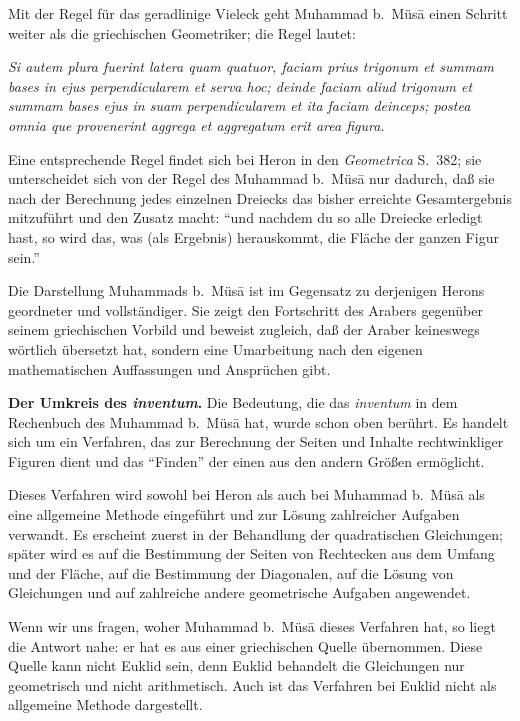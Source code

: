 \documentclass[11pt,a4paper]{article}
\newcommand{\enquote}[1]{``#1''}
\begin{document}
Mit der Regel f\"ur das geradlinige Vieleck geht Muhammad b.\ M\"us\=a einen Schritt weiter als die griechischen Geometriker; die Regel lautet:

\textit{Si autem plura fuerint latera quam quatuor, faciam prius trigonum et summam bases in ejus perpendicularem et serva hoc; deinde faciam aliud trigonum et summam bases ejus in suam perpendicularem et ita faciam deinceps; postea omnia que provenerint aggrega et aggregatum erit area figura.}

Eine entsprechende Regel findet sich bei Heron in den \textit{Geometrica} S.\ 382; sie unterscheidet sich von der Regel des Muhammad b.\ M\"us\=a nur dadurch, da\ss{} sie nach der Berechnung jedes einzelnen Dreiecks das bisher erreichte Gesamtergebnis mitzuf\"uhrt und den Zusatz macht: \enquote{und nachdem du so alle Dreiecke erledigt hast, so wird das, was (als Ergebnis) herauskommt, die Fl\"ache der ganzen Figur sein.}

Die Darstellung Muhammads b.\ M\"us\=a ist im Gegensatz zu derjenigen Herons geordneter und vollst\"andiger. Sie zeigt den Fortschritt des Arabers gegen\"uber seinem griechischen Vorbild und beweist zugleich, da\ss{} der Araber keineswegs w\"ortlich \"ubersetzt hat, sondern eine Umarbeitung nach den eigenen mathematischen Auffassungen und Anspr\"uchen gibt.

\textbf{Der Umkreis des \textit{inventum}.} Die Bedeutung, die das \textit{inventum} in dem Rechenbuch des Muhammad b.\ M\"us\=a hat, wurde schon oben ber\"uhrt. Es handelt sich um ein Verfahren, das zur Berechnung der Seiten und Inhalte rechtwinkliger Figuren dient und das \enquote{Finden} der einen aus den andern Gr\"o\ss{}en erm\"oglicht.

Dieses Verfahren wird sowohl bei Heron als auch bei Muhammad b.\ M\"us\=a als eine allgemeine Methode eingef\"uhrt und zur L\"osung zahlreicher Aufgaben verwandt. Es erscheint zuerst in der Behandlung der quadratischen Gleichungen; sp\"ater wird es auf die Bestimmung der Seiten von Rechtecken aus dem Umfang und der Fl\"ache, auf die Bestimmung der Diagonalen, auf die L\"osung von Gleichungen und auf zahlreiche andere geometrische Aufgaben angewendet.

Wenn wir uns fragen, woher Muhammad b.\ M\"us\=a dieses Verfahren hat, so liegt die Antwort nahe: er hat es aus einer griechischen Quelle \"ubernommen. Diese Quelle kann nicht Euklid sein, denn Euklid behandelt die Gleichungen nur geometrisch und nicht arithmetisch. Auch ist das Verfahren bei Euklid nicht als allgemeine Methode dargestellt.
\end{document}
